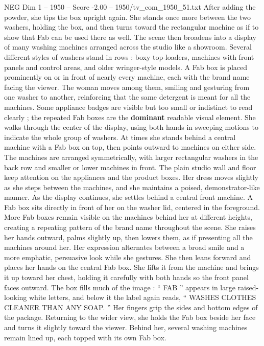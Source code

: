 \begin{textsample}{NEG Dim 1 – 1950 – Score -2.00 – 1950/tv\_com\_1950\_51.txt}
After adding the powder, she tips the box upright again.
She stands once more between the two washers, holding the box, and then turns toward the rectangular machine as if to show that Fab can be used there as well.
The scene then broadens into a display of many washing machines arranged across the studio like a showroom.
Several different styles of washers stand in rows : boxy top-loaders, machines with front panels and control areas, and older wringer-style models.
A Fab box is placed prominently on or in front of nearly every machine, each with the brand name facing the viewer.
The woman moves among them, smiling and gesturing from one washer to another, reinforcing that the same detergent is meant for all the machines.
Some appliance badges are visible but too small or indistinct to read clearly ; the repeated Fab boxes are the \textbf{dominant} readable visual element.
She walks through the center of the display, using both hands in sweeping motions to indicate the whole group of washers.
At times she stands behind a central machine with a Fab box on top, then points outward to machines on either side.
The machines are arranged symmetrically, with larger rectangular washers in the back row and smaller or lower machines in front.
The plain studio wall and floor keep attention on the appliances and the product boxes.
Her dress moves slightly as she steps between the machines, and she maintains a poised, demonstrator-like manner.
As the display continues, she settles behind a central front machine.
A Fab box sits directly in front of her on the washer lid, centered in the foreground.
More Fab boxes remain visible on the machines behind her at different heights, creating a repeating pattern of the brand name throughout the scene.
She raises her hands outward, palms slightly up, then lowers them, as if presenting all the machines around her.
Her expression alternates between a broad smile and a more emphatic, persuasive look while she gestures.
She then leans forward and places her hands on the central Fab box.
She lifts it from the machine and brings it up toward her chest, holding it carefully with both hands so the front panel faces outward.
The box fills much of the image : “ FAB ” appears in large raised-looking white letters, and below it the label again reads, “ WASHES CLOTHES CLEANER THAN ANY SOAP. ” Her fingers grip the sides and bottom edges of the package.
Returning to the wider view, she holds the Fab box beside her face and turns it slightly toward the viewer.
Behind her, several washing machines remain lined up, each topped with its own Fab box.

\end{textsample}
